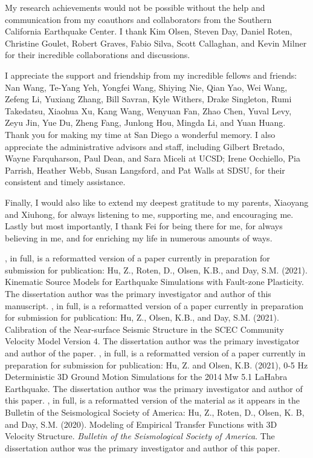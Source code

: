 \begin{frontmatter}
\begin{acknowledgements}
        My research achievements would not be possible without the help and communication from my coauthors and collaborators from the Southern California Earthquake Center. I thank Kim Olsen, Steven Day, Daniel Roten, Christine Goulet, Robert Graves, Fabio Silva, Scott Callaghan, and Kevin Milner for their incredible collaborations and discussions.

        I appreciate the support and friendship from my incredible fellows and friends: Nan Wang, Te-Yang Yeh, Yongfei Wang, Shiying Nie, Qian Yao, Wei Wang, Zefeng Li, Yuxiang Zhang, Bill Savran, Kyle Withers, Drake Singleton, Rumi Takedatsu, Xiaohua Xu, Kang Wang, Wenyuan Fan, Zhao Chen, Yuval Levy, Zeyu Jin, Yue Du, Zheng Fang, Junlong Hou, Mingda Li, and Yuan Huang. Thank you for making my time at San Diego a wonderful memory. I also appreciate the administrative advisors and staff, including Gilbert Bretado, Wayne Farquharson, Paul Dean, and Sara Miceli at UCSD; Irene Occhiello, Pia Parrish, Heather Webb, Susan Langsford, and Pat Walls at SDSU, for their consistent and timely assistance.

        Finally, I would also like to extend my deepest gratitude to my parents, Xiaoyang and Xiuhong, for always listening to me, supporting me, and encouraging me. Lastly but most importantly, I thank Fei for being there for me, for always believing in me, and for enriching my life in numerous amounts of ways.

        \bigskip

        , in full, is a reformatted version of a paper currently in preparation for submission for publication: Hu, Z., Roten, D., Olsen, K.B., and Day, S.M. (2021). Kinematic Source Models for Earthquake Simulations with Fault-zone Plasticity. The dissertation author was the primary investigator and author of this manuscript.
        , in full, is a reformatted version of a paper currently in preparation for submission for publication: Hu, Z., Olsen, K.B., and Day, S.M. (2021). Calibration of the Near-surface Seismic Structure in the SCEC Community Velocity Model Version 4. The dissertation author was the primary investigator and author of the paper.
        , in full, is a reformatted version of a paper currently in preparation for submission for publication: Hu, Z. and Olsen, K.B. (2021), 0-5 Hz Deterministic 3D Ground Motion Simulations for the 2014 Mw 5.1 LaHabra Earthquake. The dissertation author was the primary investigator and author of this paper.
        , in full, is a reformatted version of the material as it appears in the Bulletin of the Seismological Society of America: Hu, Z., Roten, D., Olsen, K. B, and Day, S.M. (2020). Modeling of Empirical Transfer Functions with 3D Velocity Structure. \emph{Bulletin of the Seismological Society of America}.
        The dissertation author was the primary investigator and author of this paper.


\end{acknowledgements}
\end{frontmatter}

